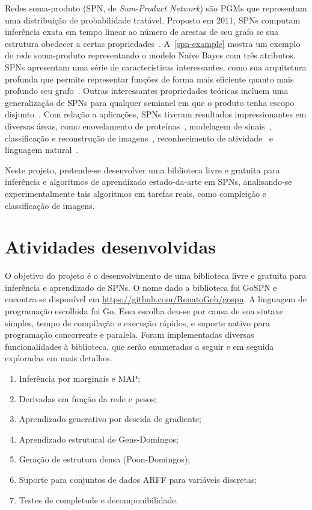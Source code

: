\documentclass[12pt]{article}
\theoremstyle{plain}
\numberwithin{equation}{section}
\begin{document}
Redes soma-produto (SPN, de \textit{Sum-Product Network}) são PGMs que representam uma distribuição
de probabilidade tratável. Proposto em 2011, SPNs computam inferência exata em tempo linear ao
número de arestas de seu grafo se sua estrutura obedecer a certas
propriedades~\cite{poon-domingos}. A~\autoref{spn-example} mostra um exemplo de rede soma-produto
representando o modelo Naïve Bayes com três atributos. SPNs apresentam uma série de características
interessantes, como sua arquitetura profunda que permite representar funções de forma mais
eficiente quanto mais profundo seu grafo~\cite{shallow-vs-deep}. Outras interessantes propriedades
teóricas incluem uma generalização de SPNs para qualquer semianel em que o produto tenha escopo
disjunto~\cite{sp-theorem}. Com relação a aplicações, SPNs tiveram resultados impressionantes em
diversas áreas, como enovelamento de proteínas~\cite{rec-dec-non-convex}, modelagem de
sinais~\cite{model-speech}, classificação e reconstrução de
imagens~\cite{gens-domingos,poon-domingos,clustering}, reconhecimento de atividade~\cite{activity}
e linguagem natural~\cite{nat-lang}.

Neste projeto, pretende-se desenvolver uma biblioteca livre e gratuita para inferência e algoritmos
de aprendizado estado-da-arte em SPNs, analisando-se experimentalmente tais algoritmos em tarefas
reais, como compleição e classificação de imagens.

\section{Atividades desenvolvidas}

O objetivo do projeto é o desenvolvimento de uma biblioteca livre e gratuita para inferência e
aprendizado de SPNs. O nome dado a biblioteca foi GoSPN e encontra-se disponível em
\url{https://github.com/RenatoGeh/gospn}. A linguagem de programação escolhida foi Go. Essa escolha
deu-se por causa de sua sintaxe simples, tempo de compilação e execução rápidos, e suporte nativo
para programação concorrente e paralela. Foram implementadas diversas funcionalidades à biblioteca,
que serão enumeradas a seguir e em seguida exploradas em mais detalhes.

\begin{enumerate}
  \item Inferência por marginais e MAP;\label{lbl-inference}
  \item Derivadas em função da rede e pesos;\label{lbl-derivative}
  \item Aprendizado generativo por descida de gradiente;\label{lbl-generativegd}
  \item Aprendizado estrutural de Gens-Domingos;\label{lbl-gensdomingos}
  \item Geração de estrutura densa (Poon-Domingos);\label{lbl-dense}
  \item Suporte para conjuntos de dados ARFF para variáveis discretas;\label{lbl-arff}
  \item Testes de completude e decomponibilidade.\label{lbl-cc}
\end{enumerate}
\end{document}
